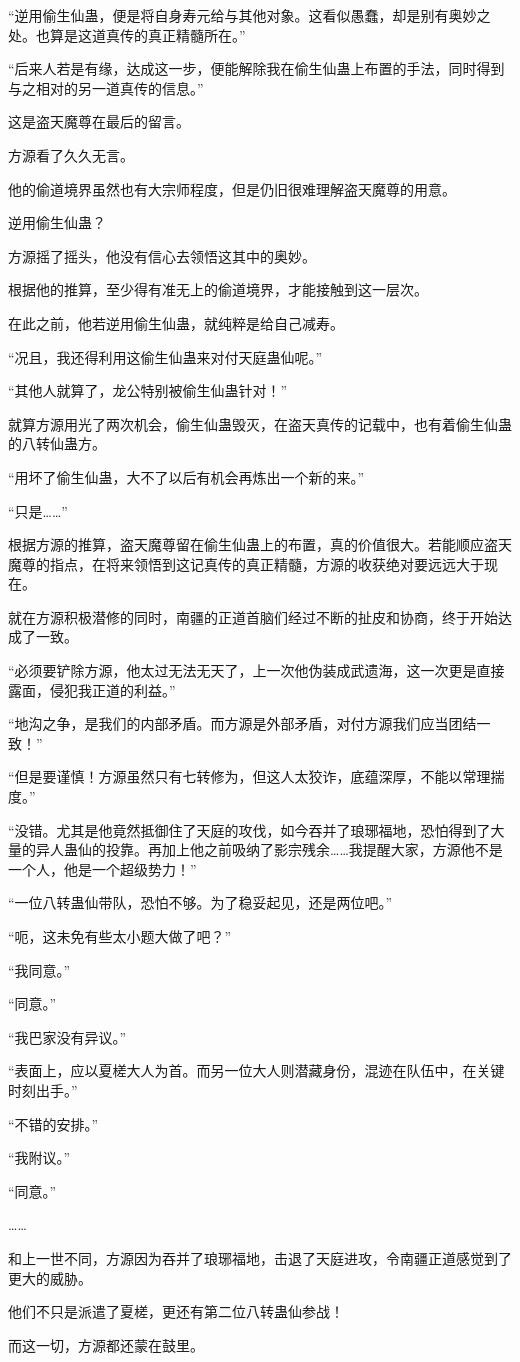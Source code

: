 \begin{this_body}
“逆用偷生仙蛊，便是将自身寿元给与其他对象。这看似愚蠢，却是别有奥妙之处。也算是这道真传的真正精髓所在。”

“后来人若是有缘，达成这一步，便能解除我在偷生仙蛊上布置的手法，同时得到与之相对的另一道真传的信息。”

这是盗天魔尊在最后的留言。

方源看了久久无言。

他的偷道境界虽然也有大宗师程度，但是仍旧很难理解盗天魔尊的用意。

逆用偷生仙蛊？

方源摇了摇头，他没有信心去领悟这其中的奥妙。

根据他的推算，至少得有准无上的偷道境界，才能接触到这一层次。

在此之前，他若逆用偷生仙蛊，就纯粹是给自己减寿。

“况且，我还得利用这偷生仙蛊来对付天庭蛊仙呢。”

“其他人就算了，龙公特别被偷生仙蛊针对！”

就算方源用光了两次机会，偷生仙蛊毁灭，在盗天真传的记载中，也有着偷生仙蛊的八转仙蛊方。

“用坏了偷生仙蛊，大不了以后有机会再炼出一个新的来。”

“只是……”

根据方源的推算，盗天魔尊留在偷生仙蛊上的布置，真的价值很大。若能顺应盗天魔尊的指点，在将来领悟到这记真传的真正精髓，方源的收获绝对要远远大于现在。

就在方源积极潜修的同时，南疆的正道首脑们经过不断的扯皮和协商，终于开始达成了一致。

“必须要铲除方源，他太过无法无天了，上一次他伪装成武遗海，这一次更是直接露面，侵犯我正道的利益。”

“地沟之争，是我们的内部矛盾。而方源是外部矛盾，对付方源我们应当团结一致！”

“但是要谨慎！方源虽然只有七转修为，但这人太狡诈，底蕴深厚，不能以常理揣度。”

“没错。尤其是他竟然抵御住了天庭的攻伐，如今吞并了琅琊福地，恐怕得到了大量的异人蛊仙的投靠。再加上他之前吸纳了影宗残余……我提醒大家，方源他不是一个人，他是一个超级势力！”

“一位八转蛊仙带队，恐怕不够。为了稳妥起见，还是两位吧。”

“呃，这未免有些太小题大做了吧？”

“我同意。”

“同意。”

“我巴家没有异议。”

“表面上，应以夏槎大人为首。而另一位大人则潜藏身份，混迹在队伍中，在关键时刻出手。”

“不错的安排。”

“我附议。”

“同意。”

……

和上一世不同，方源因为吞并了琅琊福地，击退了天庭进攻，令南疆正道感觉到了更大的威胁。

他们不只是派遣了夏槎，更还有第二位八转蛊仙参战！

而这一切，方源都还蒙在鼓里。

\end{this_body}

